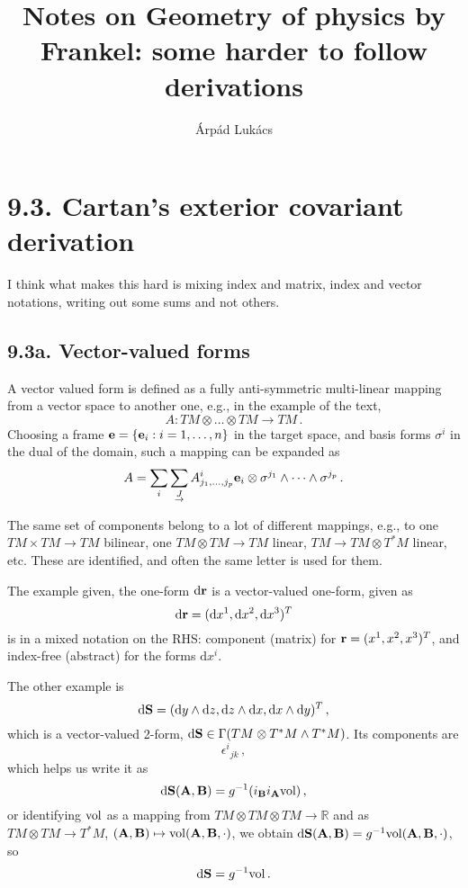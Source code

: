 \documentclass[a4paper,12pt]{article}
\title{Notes on Geometry of physics by Frankel: some harder to follow derivations}
\author{Árpád Lukács}
\def\d{\mathrm{d}}
\begin{document}
\maketitle

\section*{9.3. Cartan's exterior covariant derivation}

I think what makes this hard is mixing index and matrix, index and vector notations, writing out some sums and not others.

\subsection*{9.3a. Vector-valued forms}
A vector valued form is defined as a fully anti-symmetric multi-linear mapping from a vector space to another one, e.g., in the example of the text,
\[
A : TM\otimes \dots \otimes TM \to TM\,.
\]
Choosing a frame ${\bf e} = \{{\bf e}_i : i=1,\dots, n\}$ in the target space, and basis forms $\sigma^i$ in the dual of the domain, such a mapping can be expanded as
\[
A = \sum_i \sum_{\underrightarrow{J}}A^i_{j_1,\dots,j_p} {\bf e}_i \otimes \sigma^{j_1}\wedge\dots\wedge\sigma^{j_p}\,.
\]

The same set of components belong to a lot of different mappings, e.g., to one $TM\times TM \to TM$ bilinear, one $TM\otimes TM\to TM$ linear, $TM\to TM\otimes T^*M$ linear, etc. These are identified, and often the same letter is used for them.

The example given, the one-form $\d {\bf r}$ is a vector-valued one-form, given as
\[
 \d {\bf r} = (\d x^1, \d x^2, \d x^3)^T
\]
is in a mixed notation on the RHS: component (matrix) for ${\bf r}=(x^1, x^2, x^3)^T$, and index-free (abstract) for the forms $\d x^i$.


The other example is
\[
 \d {\bf S} = (\d y \wedge \d z, \d z\wedge\d x, \d x\wedge \d y)^T\,,
\]
which is a vector-valued 2-form, $\d {\bf S} \in \Gamma(TM \otimes T^*M \wedge T^*M)$. Its components are
\[
 \epsilon^i{}_{jk}\,,
\]
which helps us write it as
\[
 \d{\bf S} ({\bf A}, {\bf B})=g^{-1}(i_{\bf B} i_{\bf A}{\rm vol})\,,
\]
or identifying ${\rm vol}$ as a mapping from $TM\otimes TM\otimes TM \to \mathbb{R}$ and as $TM\otimes TM\to T^*M$, $({\bf A}, {\bf B}) \mapsto {\rm vol}({\bf A}, {\bf B}, \cdot)$, we obtain $\d{\bf S}({\bf A}, {\bf B}) = g^{-1} {\rm vol}({\bf A}, {\bf B}, \cdot)$, so
\[
 \d {\bf S} = g^{-1} {\rm vol}\,.
\]
\end{document}
